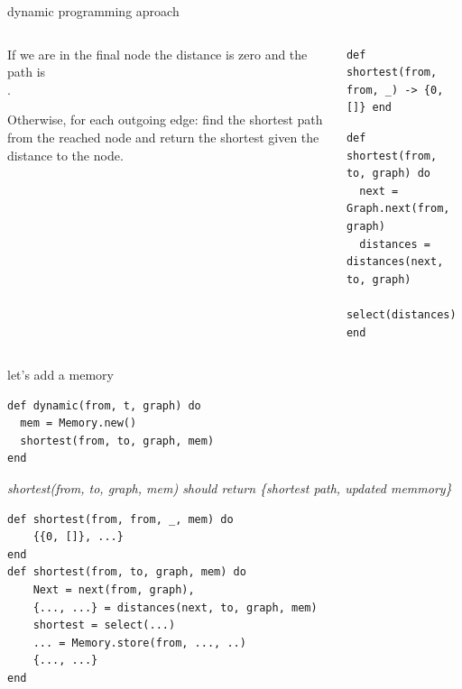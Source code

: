 \begin{frame}[fragile]{dynamic programming aproach}

\begin{columns}
 \begin{column}{0.4\linewidth}
  If we are in the final node the distance is zero and the path is \[\].

  \vspace{10pt}
  Otherwise, for each outgoing edge: find the shortest path from the
  reached node and return the shortest given the distance to the node.

 \end{column}
 \begin{column}{0.6\linewidth}
   \begin{verbatim}
def shortest(from, from, _) -> {0, []} end
  \end{verbatim}
  \pause
  \begin{verbatim}
def shortest(from, to, graph) do
  next = Graph.next(from, graph)
  distances = distances(next, to, graph)
  select(distances)
end
  \end{verbatim}
 \end{column}
\end{columns}

\pause\vspace{20pt}{\em What is the complexity?}

\end{frame}

\begin{frame}[fragile]{let's add a memory}

\begin{verbatim}
def dynamic(from, t, graph) do
  mem = Memory.new()
  shortest(from, to, graph, mem)
end
\end{verbatim}

\pause\vspace{10pt}

{\em shortest(from, to, graph, mem) should return \{shortest path, updated memmory\}}

\pause\vspace{10pt}
\begin{verbatim}
def shortest(from, from, _, mem) do
    {{0, []}, ...}
end
def shortest(from, to, graph, mem) do
    Next = next(from, graph),
    {..., ...} = distances(next, to, graph, mem)
    shortest = select(...)
    ... = Memory.store(from, ..., ..)
    {..., ...}
end
\end{verbatim}

\end{frame}

